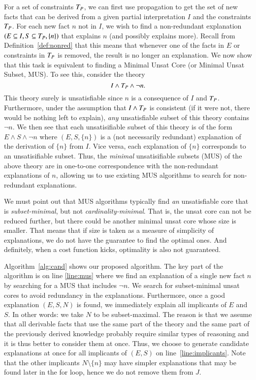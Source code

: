 For a set of constraints $T_P$, we can first use propagation to get the set of new facts that can be derived from a given partial interpretation $I$ and the constraints $T_P$. 
For each new fact $n$ not in $I$, we wish to find a non-redundant explanation $(E \subseteq I, S \subseteq T_P,\{n\})$ that explains $n$ (and possibly explains more). 
Recall from Definition~\ref{def:nonred} that this means that whenever one of the facts in $E$ or constraints in $T_P$ is removed, the result is no longer an explanation.
We now show that this task is equivalent to finding a Minimal Unsat Core (or Minimal Unsat Subset, MUS).
To see this, consider the theory
\[ I\wedge T_P \wedge \lnot n.\]
This theory surely is unsatisfiable since $n$ is a consequence of $I$ and $T_P$.
Furthermore, under the assumption that $I\wedge T_P$ is consistent (if it were not, there would be nothing left to explain),
\emph{any} unsatisfiable subset of this theory contains $\lnot n$.
We then see that each unsatisifiable subset of this theory is of the form $E \wedge S \wedge \lnot n$ where $(E,S,\{n\})$ is a (not necessarily redundant) explanation of the derivation of $\{n\}$ from $I$.
Vice versa, each explanation of $\{n\}$ corresponds to an unsatisifiable subset. Thus, the \emph{minimal} unsatisifiable subsets (MUS) of the above theory are in one-to-one correspondence with the non-redundant explanations of $n$, allowing us to use existing MUS algorithms to search for non-redundant explanations.

We must point out that MUS algorithms typically find \textit{an} unsatisfiable core that is \textit{subset-minimal}, but not \textit{cardinality-minimal}. That is, the unsat core can not be reduced further, but there could be another minimal unsat core whose size is smaller.
That means that if size is taken as a measure of simplicity of explanations, we do not have the guarantee to find the optimal ones. And definitely, when a cost function kicks, optimality is also not guaranteed.

Algorithm~\ref{alg:cand} shows our proposed algorithm. The key part of the algorithm is on line \ref{line:mus} where we find an explanation of a single new fact $n$ by searching for a MUS that includes $\neg n$.
We search for subset-minimal unsat cores to avoid redundancy in the explanations.
Furthermore, once a good explanation $(E,S,N)$ is found, we immediately explain all implicants of $E$ and $S$. In other words: we take $N$ to be subset-maximal.
The reason is that we assume that all derivable facts that use the same part of the theory and the same part of the previously derived knowledge probably require similar types of reasoning and it is thus better to consider them at once.
Thus, we choose to generate candidate explanations at once for all implicants of $(E, S)$ on line~\ref{line:implicants}.
Note that the other implicants $N \setminus \{n\}$ may have simpler explanations that may be found later in the for loop, hence we do not remove them from $J$.

